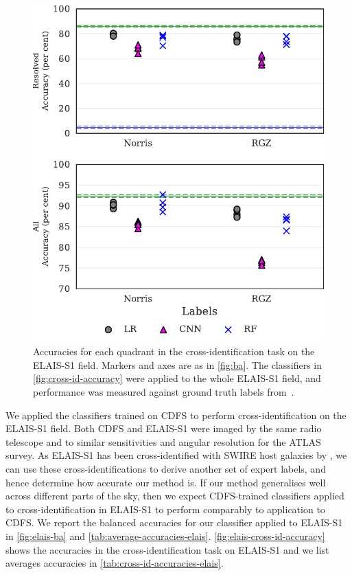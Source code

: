 \documentclass[fleqn,usenatbib,usedcolumn]{mnras}
\begin{document}
  \begin{figure}
    \centering
    \includegraphics[width=\columnwidth]{images/elais_cross_identification_grid.pdf}
    \caption{Accuracies for each quadrant in the cross-identification
      task on the ELAIS-S1 field. Markers and axes are as in \autoref{fig:ba}.
      The classifiers in \autoref{fig:cross-id-accuracy} were applied to the
      whole ELAIS-S1 field, and performance was measured against ground truth
      labels from~\citet{middelberg08}.
      \label{fig:elais-cross-id-accuracy}}
  \end{figure}

  We applied the classifiers trained on CDFS to perform cross-identification
  on the ELAIS-S1 field. Both CDFS and ELAIS-S1 were imaged by the same radio
  telescope and to similar sensitivities and angular resolution for the ATLAS
  survey.  As ELAIS-S1 has been cross-identified with SWIRE host galaxies by
  \citet{middelberg08}, we can use these cross-identifications to derive
  another set of expert labels, and hence determine how accurate our method
  is. If our method generalises well across different parts of the sky, then
  we expect CDFS-trained classifiers applied to cross-identification in
  ELAIS-S1 to perform comparably to application to CDFS. We report the
  balanced accuracies for our classifier applied to ELAIS-S1 in
  \autoref{fig:elais-ba} and \autoref{tab:average-accuracies-elais}.
  \autoref{fig:elais-cross-id-accuracy} shows the accuracies in the
  cross-identification task on ELAIS-S1 and we list averages accuracies in
  \autoref{tab:cross-id-accuracies-elais}.
\end{document}
